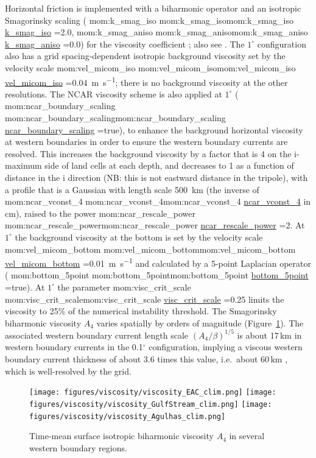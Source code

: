 \documentclass[11pt]{article}
\makeatletter
\newcommand{\TODO}[1]{\note{\textcolor{blue}{\textsf{\textbf{TODO: #1}}}}}
\newcommand*{\make@hex@label}[1]{%
  \def\hex@label{#1}%
  \@onelevel@sanitize\hex@label
  \EdefEscapeHex\hex@label{\hex@label}%
}
\newcommand*{\hexhyperlink}[2]{%
  \make@hex@label{#1}%
  \hyperlink{\hex@label}{#2}%
}
\newcommand{\momlink}[2]{\hexhyperlink{mom:#2}{#1}}
\newcommand{\param}[1]{\textsf{#1}}
\newcommand{\mom}[1]{\param{\momlink{#1}{#1}}}
\makeatother
\begin{document}
Horizontal friction is implemented with a biharmonic operator and an isotropic Smagorinsky scaling (\mom{k_smag_iso}=2.0, \mom{k_smag_aniso}=0.0) for the viscosity coefficient \citep{GriffiesHallberg2000a}; also see \citet[][chapter~25]{Griffies2012a}.
The $1^\circ$ configuration also has a grid spacing-dependent \TODO{check} isotropic background viscosity set by the velocity scale \mom{vel_micom_iso}=\SI{0.04}{m s^{-1}}; there is no background viscosity at the other resolutions.
The NCAR viscosity scheme is also applied at $1^\circ$ (\mom{ncar_boundary_scaling}=true), to enhance the background horizontal viscosity at western boundaries in order to ensure the western boundary currents are resolved.
This increases the background viscosity by a factor that is 4 on the i-maximum side of land cells at each depth, and decreases to 1 as a function of distance in the i direction (NB: this is not eastward distance in the tripole), with a profile that is a Gaussian with length scale \SI{500}{km} (the inverse of \mom{ncar_vconst_4} in cm), raised to the power \mom{ncar_rescale_power}=2.
At $1^\circ$ the background viscosity at the bottom is set by the velocity scale \mom{vel_micom_bottom}=\SI{0.01}{m s^{-1}} and calculated by a 5-point Laplacian operator (\mom{bottom_5point}=true).
At $1^\circ$ the parameter \mom{visc_crit_scale}=0.25 limits the viscosity to 25\% of the numerical instability threshold.
The Smagorinsky biharmonic viscosity $A_4$ varies spatially by orders of magnitude (Figure~\ref{F:viscosity}).
The associated western boundary current length scale $(A_4/\beta)^{1/5}$ is about 17\,km in western boundary currents in the 0.1$^\circ$ configuration, implying a viscous western boundary current thickness of about 3.6 times this value, i.e.\ about 60\,km \citep[see][Appendix~B]{HaidvogelETAL92a}, which is well-resolved by the grid.

\begin{figure}[htbp]
\begin{center}
\texttt{[image: figures/viscosity/viscosity\_EAC\_clim.png]}
\texttt{[image: figures/viscosity/viscosity\_GulfStream\_clim.png]}
\texttt{[image: figures/viscosity/viscosity\_Agulhas\_clim.png]}
\caption{Time-mean surface isotropic biharmonic viscosity $A_4$ in several western boundary regions.}
\label{F:viscosity}
\end{center}
\end{figure}
\end{document}

